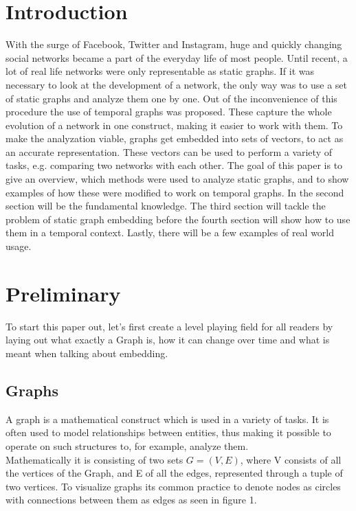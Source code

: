 \documentclass[sigconf]{acmart}
\begin{document}
\section{Introduction}
With the surge of Facebook, Twitter and Instagram, huge and quickly changing social networks became a part of the everyday life of most people.
Until recent, a lot of real life networks were only representable as static graphs. If it was necessary to look at the development of a network, the only way was to use a set of static graphs and analyze them one by one.
Out of the inconvenience of this procedure the use of temporal graphs was proposed. These capture the whole evolution of a network in one construct, making it easier to work with them.
To make the analyzation viable, graphs get embedded into sets of vectors, to act as an accurate representation. 
These vectors can be used to perform a variety of tasks, e.g. comparing two networks with each other.
The goal of this paper is to give an overview, which methods were used to analyze static graphs, and to show examples of how these were modified to work on 
temporal graphs.
In the second section will be the fundamental knowledge. The third section will tackle the problem of static graph embedding before the fourth section will show how to
use them in a temporal context. Lastly, there will be a few examples of real world usage. 


\section{Preliminary}
To start this paper out, let's first create a level playing field for all readers by laying out what exactly a Graph is, 
how it can change over time and what is meant when talking about embedding.



\subsection{Graphs}
A graph is a mathematical construct which is used in a variety of tasks. It is often used to model relationships between 
entities, thus making it possible to operate on such structures to, for example, analyze them.\\
Mathematically it is consisting of two sets \(G = (V, E)\), where V consists of all the vertices of the Graph, and E of all the edges, represented through a tuple of two vertices.
To visualize graphs its common practice to denote nodes as circles with connections between them as edges as seen in figure 1.
\end{document}
